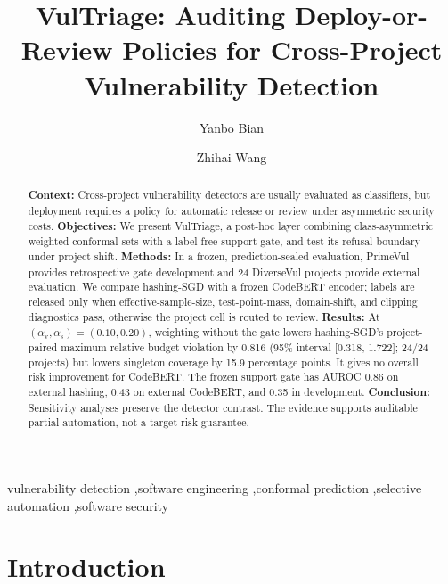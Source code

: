 \documentclass[preprint,12pt]{elsarticle}
\def\corref#1{}%
\def\cortext[#1]#2{}%
\def\ead#1{}%
\def\address[#1]#2{}%
\newcommand{\method}{VulTriage\xspace}
\newcommand{\av}{\alpha_{\mathrm{v}}}
\newcommand{\as}{\alpha_{\mathrm{s}}}
\begin{document}
\begin{frontmatter}

\title{VulTriage: Auditing Deploy-or-Review Policies for Cross-Project Vulnerability Detection}

\author[inst1]{Yanbo Bian\corref{cor1}}
\ead{24722081@bjtu.edu.cn}
\author[inst2]{Zhihai Wang}
\ead{zhhwang@bjtu.edu.cn}
\cortext[cor1]{Corresponding author: Yanbo Bian.}
\address[inst1]{Computer Science and Technology Program, Weihai International College, Beijing Jiaotong University, Weihai 264401, China}
\address[inst2]{School of Computer Science and Technology, Beijing Jiaotong University, Beijing 100044, China}

\begin{abstract}
\textbf{Context:} Cross-project vulnerability detectors are usually evaluated as classifiers, but deployment requires a policy for automatic release or review under asymmetric security costs. \textbf{Objectives:} We present \method, a post-hoc layer combining class-asymmetric weighted conformal sets with a label-free support gate, and test its refusal boundary under project shift. \textbf{Methods:} In a frozen, prediction-sealed evaluation, PrimeVul provides retrospective gate development and 24 DiverseVul projects provide external evaluation. We compare hashing-SGD with a frozen CodeBERT encoder; labels are released only when effective-sample-size, test-point-mass, domain-shift, and clipping diagnostics pass, otherwise the project cell is routed to review. \textbf{Results:} At $(\av,\as)=(0.10,0.20)$, weighting without the gate lowers hashing-SGD's project-paired maximum relative budget violation by 0.816 (95\% interval [0.318, 1.722]; 24/24 projects) but lowers singleton coverage by 15.9 percentage points. It gives no overall risk improvement for CodeBERT. The frozen support gate has AUROC 0.86 on external hashing, 0.43 on external CodeBERT, and 0.35 in development. \textbf{Conclusion:} Sensitivity analyses preserve the detector contrast. The evidence supports auditable partial automation, not a target-risk guarantee.
\end{abstract}

\begin{keyword}
 vulnerability detection \sep software engineering \sep conformal prediction \sep selective automation \sep software security
\end{keyword}
\end{frontmatter}

\section{Introduction}
\end{document}

